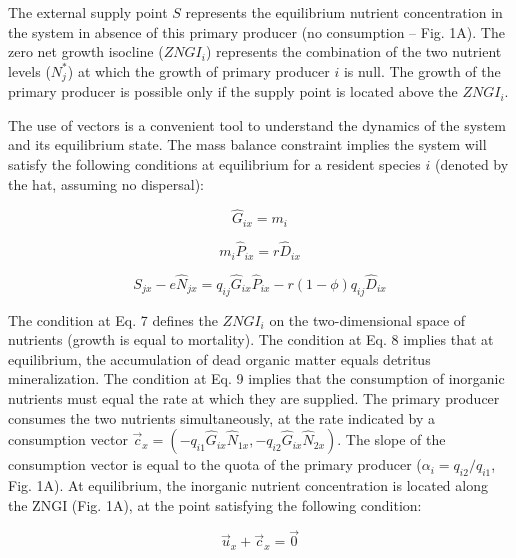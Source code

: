 \documentclass[letterpaper,twocolumn,showkeys]{revtex4-1}
\begin{document}
The external supply point $S$ represents the equilibrium nutrient concentration in the system in absence of this primary producer (no consumption – Fig. 1A). The zero net growth isocline ($ZNGI_i$) represents the combination of the two nutrient levels ($N_{j}^*$) at which the growth of primary producer $i$ is null. The growth of the primary producer is possible only if the supply point is located above the $ZNGI_i$. 

The use of vectors is a convenient tool to understand the dynamics of the system and its equilibrium state. The mass balance constraint implies the system will satisfy the following conditions at equilibrium for a resident species $i$ (denoted by the hat, assuming no dispersal):

\begin{equation}
	\label{e:bnet}
	\widehat{G} _{ix}= m_{i} 
\end{equation}

\begin{equation}
	\label{e:bnet}
	m_{i}\widehat{P}_{ix}=r\widehat{D}_{ix} 
\end{equation}

\begin{equation}
	\label{e:bnet}
	S_{jx}-e\widehat{N}_{jx}=q_{ij}\widehat{G}_{ix}\widehat{P}_{ix}-r(1-\phi)q_{ij}\widehat{D}_{ix}
\end{equation}

The condition at Eq. 7 defines the $ZNGI_i$ on the two-dimensional space of nutrients (growth is equal to mortality). The condition at Eq. 8 implies that at equilibrium, the accumulation of dead organic matter equals detritus mineralization. The condition at Eq. 9 implies that the consumption of inorganic nutrients must equal the rate at which they are supplied. The primary producer consumes the two nutrients simultaneously, at the rate indicated by a consumption vector $\overrightarrow{c}_{x} = (-q_{i1}\widehat{G}_{ix}\widehat{N}_{1x},-q_{i2}\widehat{G}_{ix}\widehat{N}_{2x})$. The slope of the consumption vector is equal to the quota of the primary producer ($\alpha_{i}=q_{i2}/q_{i1}$, Fig. 1A). At equilibrium, the inorganic nutrient concentration is located along the ZNGI (Fig. 1A), at the point satisfying the following condition:

\begin{equation}
	\label{e:bnet}
	\overrightarrow{u}_{x}+\overrightarrow{c}_{x}=\overrightarrow{0}
\end{equation}		 	
\end{document}
